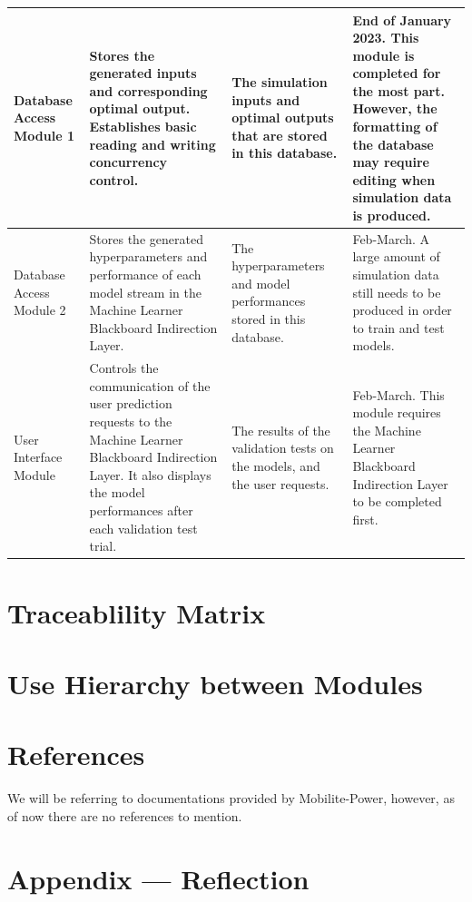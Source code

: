 \documentclass[12pt, titlepage]{article}
\begin{document}
\begin{longtable}{|p{2cm}|p{3cm}|p{3cm}|p{3cm}}
    \hline 
    Database Access Module 1 & Stores the generated inputs and corresponding optimal output. Establishes basic reading and writing concurrency control. & The simulation inputs and optimal outputs that are stored in this database. & End of January 2023. This module is completed for the most part. However, the formatting of the database may require editing when simulation data is produced.\\
    \hline 
    Database Access Module 2 & Stores the generated hyperparameters and performance of each model stream in the Machine Learner Blackboard Indirection Layer. & The hyperparameters and model performances stored in this database. & Feb-March. A large amount of simulation data still needs to be produced in order to train and test models.\\
    \hline 
    User Interface Module & Controls the communication of the user prediction requests to the Machine Learner Blackboard Indirection Layer. It also displays the model performances after each validation test trial. & The results of the validation tests on the models, and the user requests. & Feb-March. This module requires the Machine Learner Blackboard Indirection Layer to be completed first. \\
    \hline 
\end{longtable}
  

\section{Traceablility Matrix}

\section{Use Hierarchy between Modules}

\section*{References}
We will be referring to documentations provided by Mobilite-Power, however, as of now there are no references to mention.





\newpage

\newpage{}
\section*{Appendix --- Reflection}
\end{document}
